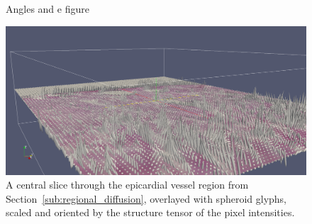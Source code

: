   \begin{figure}[htbp]
    \centering
    \caption{Angles and e figure}
    \label{fig:2D_angles}
  \end{figure}
  
  
  
  \begin{figure}
    \centering
    \includegraphics[width=\textwidth]{Ch7/Figs/structure_tensor_glyphs}
    \caption{A central slice through the epicardial vessel region from Section~\ref{sub:regional_diffusion}, overlayed with spheroid glyphs, scaled and oriented by the structure tensor of the pixel intensities.}
    \label{fig:structure_tensor_glyphs}
  \end{figure}
  
